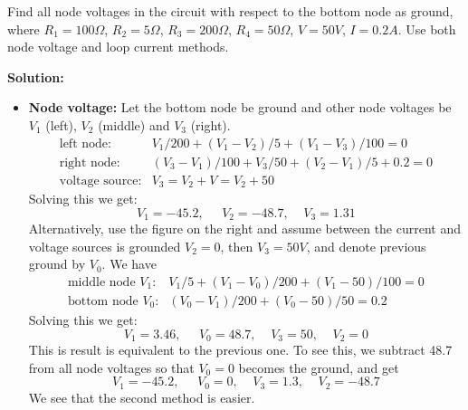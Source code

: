 \usepackage{html}


Find all node voltages in the circuit with respect to the bottom node as
ground, where $R_1=100\Omega$, $R_2=5\Omega$, $R_3=200\Omega$, $R_4=50\Omega$, 
$V=50V$, $I=0.2A$.  Use both node voltage and loop current methods.

  
  {\bf Solution:} 
  \begin{itemize}
    \item {\bf Node voltage:} Let the bottom node be ground and other node
      voltages be $V_1$ (left), $V_2$ (middle) and $V_3$ (right).
      \[ \begin{array}{ll}
	\mbox{left node:} & V_1/200+(V_1-V_2)/5+(V_1-V_3)/100=0 \\
	\mbox{right node:} & (V_3-V_1)/100+V_3/50+(V_2-V_1)/5+0.2=0 \\
	\mbox{voltage source:} & V_3=V_2+V=V_2+50 \end{array} \]
      Solving this we get:
      \[ V_1=-45.2,\;\;\;\;\;V_2=-48.7,\;\;\;\;V_3=1.31 \]
      Alternatively, use the figure on the right and assume between the current 
      and voltage sources is grounded $V_2=0$, then $V_3=50V$, and denote previous 
      ground by $V_0$. We have
      \[ 
      \begin{array}{ll}
	\mbox{middle node $V_1$:} & V_1/5+(V_1-V_0)/200+(V_1-50)/100=0 \\
	\mbox{bottom node $V_0$:} & (V_0-V_1)/200+(V_0-50)/50=0.2 
      \end{array} 
      \]
      Solving this we get: 
      \[
      V_1=3.46,\;\;\;\;\;V_0=48.7,\;\;\;\;V_3=50,\;\;\;\;V_2=0 
      \]
      This is result is equivalent to the previous one. To see this, 
      we subtract 48.7 from all node voltages so that $V_0=0$ becomes
      the ground, and get
      \[
      V_1=-45.2,\;\;\;\;\;V_0=0,\;\;\;\;V_3=1.3,\;\;\;\;V_2=-48.7 
      \]
      We see that the second method is easier.


\end{itemize}
